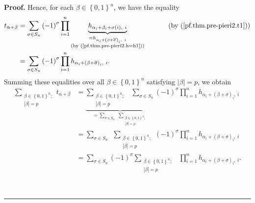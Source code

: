 \documentclass
[numbers=enddot,12pt,final,onecolumn,notitlepage,english]{scrartcl}%
\theoremstyle{definition}
\newenvironment{proof}[1][Proof]{\noindent\textbf{#1.} }{\ \rule{0.5em}{0.5em}}
\let\sumnonlimits\sum
\let\prodnonlimits\prod
\renewcommand{\sum}{\sumnonlimits\limits}
\renewcommand{\prod}{\prodnonlimits\limits}
\newenvironment{verlong}{}{}
\begin{document}
\begin{verlong}
\begin{proof}
Hence, for each $\beta\in\left\{  0,1\right\}  ^{n}$, we have the equality%
\begin{align*}
t_{\alpha+\beta}  &  =\sum_{\sigma\in S_{n}}\left(  -1\right)  ^{\sigma}%
\prod_{i=1}^{n}\underbrace{h_{\alpha_{i}+\beta_{i}+\sigma\left(  i\right)
,\ i}}_{\substack{=h_{\alpha_{i}+\left(  \beta+\overline{\sigma}\right)
_{i},\ i}\\\text{(by (\ref{pf.thm.pre-pieri2.h=h1}))}}%
}\ \ \ \ \ \ \ \ \ \ \left(  \text{by (\ref{pf.thm.pre-pieri2.t1})}\right) \\
&  =\sum_{\sigma\in S_{n}}\left(  -1\right)  ^{\sigma}\prod_{i=1}^{n}%
h_{\alpha_{i}+\left(  \beta+\overline{\sigma}\right)  _{i},\ i}.
\end{align*}
Summing these equalities over all $\beta\in\left\{  0,1\right\}  ^{n}$
satisfying $\left\vert \beta\right\vert =p$, we obtain%
\begin{align}
\sum_{\substack{\beta\in\left\{  0,1\right\}  ^{n};\\\left\vert \beta
\right\vert =p}}t_{\alpha+\beta}  &  =\underbrace{\sum_{\substack{\beta
\in\left\{  0,1\right\}  ^{n};\\\left\vert \beta\right\vert =p}}\ \ \sum
_{\sigma\in S_{n}}}_{=\sum_{\sigma\in S_{n}}\ \ \sum_{\substack{\beta
\in\left\{  0,1\right\}  ^{n};\\\left\vert \beta\right\vert =p}}}\left(
-1\right)  ^{\sigma}\prod_{i=1}^{n}h_{\alpha_{i}+\left(  \beta+\overline
{\sigma}\right)  _{i},\ i}\nonumber\\
&  =\sum_{\sigma\in S_{n}}\ \ \sum_{\substack{\beta\in\left\{  0,1\right\}
^{n};\\\left\vert \beta\right\vert =p}}\left(  -1\right)  ^{\sigma}\prod
_{i=1}^{n}h_{\alpha_{i}+\left(  \beta+\overline{\sigma}\right)  _{i}%
,\ i}\nonumber\\
&  =\sum_{\sigma\in S_{n}}\left(  -1\right)  ^{\sigma}\sum_{\substack{\beta
\in\left\{  0,1\right\}  ^{n};\\\left\vert \beta\right\vert =p}}\ \ \prod
_{i=1}^{n}h_{\alpha_{i}+\left(  \beta+\overline{\sigma}\right)  _{i},\ i}.
\label{pf.thm.pre-pieri2.sumt=1}%
\end{align}



\end{proof}
\end{verlong}
\end{document}
